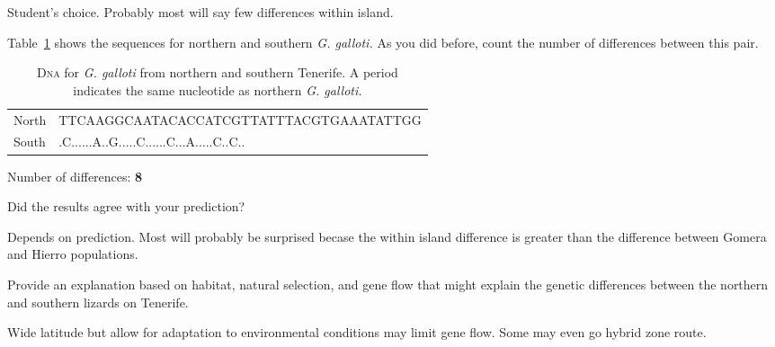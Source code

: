 \documentclass[12pt, hidelinks]{exam}
\newcommand*\AnswerBox[2]{%
    \parbox[t][#1]{0.92\textwidth}{%
    \begin{solution}#2\end{solution}}
    \vspace{\stretch{1}}
}
\begin{document}
\begin{questions}
\AnswerBox{2\baselineskip}{Student's choice. Probably most will say few differences within island.}

\question
Table~\ref{tab:galloti} shows the sequences for northern and southern \textit{G. galloti.} As you did before, count the number of differences between this pair.

{\dnatable
\begin{longtable}[l]{ll}
\caption{D\textsc{na} for \textit{G. galloti} from northern and southern Tenerife. A period \\indicates the same nucleotide as northern \textit{G. galloti.}\label{tab:galloti}}\tabularnewline
\toprule
{\regfont North} & TTCAAGGCAATACACCATCGTTATTTACGTGAAATATTGG \tabularnewline
{\regfont South} & .C......A..G.....C......C...A.....C..C.. \tabularnewline
\bottomrule
\end{longtable}
}

Number of differences: \ifprintanswers \textbf{8} \fi

\vspace{\baselineskip}

\question
Did the results agree with your prediction? 

\AnswerBox{2\baselineskip}{Depends on prediction. Most will probably be surprised becase the within island difference is greater than the difference between Gomera and Hierro populations.}

\question[Checkout]
Provide an explanation based on habitat, natural selection, and gene flow that might explain the genetic differences between the northern and southern lizards on Tenerife.

\AnswerBox{3\baselineskip}{Wide latitude but allow for adaptation to environmental conditions may limit gene flow. Some may even go hybrid zone route.}


\end{questions}


\newpage
\end{document}
